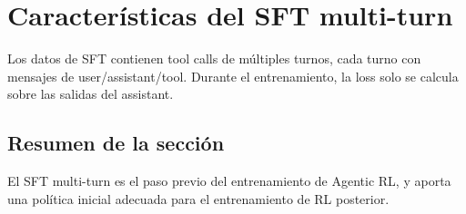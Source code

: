 \section{Características del SFT multi-turn}
Los datos de SFT contienen tool calls de múltiples turnos, cada turno con mensajes de user/assistant/tool. Durante el entrenamiento, la loss solo se calcula sobre las salidas del assistant.

\subsection{Resumen de la sección}
El SFT multi-turn es el paso previo del entrenamiento de Agentic RL, y aporta una política inicial adecuada para el entrenamiento de RL posterior.

\newpage
